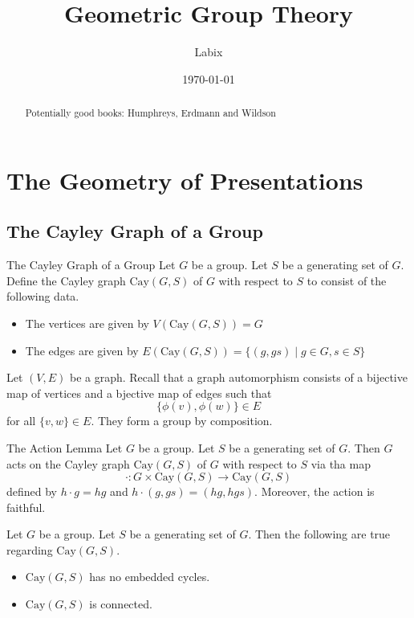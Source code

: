 \documentclass[a4paper]{article}
\title{Geometric Group Theory}
\author{Labix}
\date{\today}
\begin{document}
\maketitle
\begin{abstract}
Potentially good books: Humphreys, Erdmann and Wildson
\end{abstract}
\pagebreak
\tableofcontents

\pagebreak
\section{The Geometry of Presentations}
\subsection{The Cayley Graph of a Group}
\begin{defn}{The Cayley Graph of a Group}{} Let $G$ be a group. Let $S$ be a generating set of $G$. Define the Cayley graph $\text{Cay}(G,S)$ of $G$ with respect to $S$ to consist of the following data. 
\begin{itemize}
\item The vertices are given by $V(\text{Cay}(G,S))=G$
\item The edges are given by $E(\text{Cay}(G,S))=\{(g,gs)\;|\;g\in G,s\in S\}$
\end{itemize}
\end{defn}

Let $(V,E)$ be a graph. Recall that a graph automorphism consists of a bijective map of vertices and a bjective map of edges such that $$\{\phi(v),\phi(w)\}\in E$$ for all $\{v,w\}\in E$. They form a group by composition. 

\begin{lmm}{The Action Lemma}{} Let $G$ be a group. Let $S$ be a generating set of $G$. Then $G$ acts on the Cayley graph $\text{Cay}(G,S)$ of $G$ with respect to $S$ via tha map $$\cdot:G\times\text{Cay}(G,S)\to\text{Cay}(G,S)$$ defined by $h\cdot g=hg$ and $h\cdot (g,gs)=(hg,hgs)$. Moreover, the action is faithful. 
\end{lmm}

\begin{prp}{}{} Let $G$ be a group. Let $S$ be a generating set of $G$. Then the following are true regarding $\text{Cay}(G,S)$. 
\begin{itemize}
\item $\text{Cay}(G,S)$ has no embedded cycles. 
\item $\text{Cay}(G,S)$ is connected. 
\end{itemize}
\end{prp}
\end{document}
